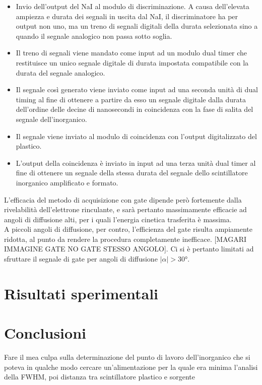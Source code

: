 \documentclass[11pt]{article}
\begin{document}
\begin{itemize}
	\item Invio dell'output del NaI al modulo di discriminazione. A causa dell'elevata ampiezza e durata dei segnali in uscita dal NaI, il discriminatore ha per output non uno, ma un treno di segnali digitali della durata selezionata sino a quando il segnale analogico non passa sotto soglia.
	\item Il treno di segnali viene mandato come input ad un modulo dual timer che restituisce un unico segnale digitale di durata impostata compatibile con la durata del segnale analogico.
	\item Il segnale così generato viene inviato come input ad una seconda unità di dual timing al fine di ottenere a partire da esso un segnale digitale dalla durata dell'ordine delle decine di nanosecondi in coincidenza con la fase di salita del segnale dell'inorganico.
	\item Il segnale viene inviato al modulo di coincidenza con l'output digitalizzato del plastico.
	\item L'output della coincidenza è inviato in input ad una terza unità dual timer al fine di ottenere un segnale della stessa durata del segnale dello scintillatore inorganico amplificato e formato.
\end{itemize}

L'efficacia del metodo di acquisizione con gate dipende però fortemente dalla rivelabilità dell'elettrone rinculante, e sarà pertanto massimamente efficacie ad angoli di diffusione alti, per i quali l'energia cinetica trasferita è massima. \\
A piccoli angoli di diffusione, per contro, l'efficienza del gate risulta ampiamente ridotta, al punto da rendere la procedura completamente inefficace. [MAGARI IMMAGINE GATE NO GATE STESSO ANGOLO]. Ci si è pertanto limitati ad sfruttare il segnale di gate per angoli di diffusione $|\alpha|>30°$. 


\section{Risultati sperimentali}


\section{Conclusioni}
Fare il mea culpa sulla determinazione del punto di lavoro dell'inorganico che si poteva in qualche modo cercare un'alimentazione per la quale era minima l'analisi della FWHM, poi distanza tra scintillatore plastico e sorgente


\end{document}
